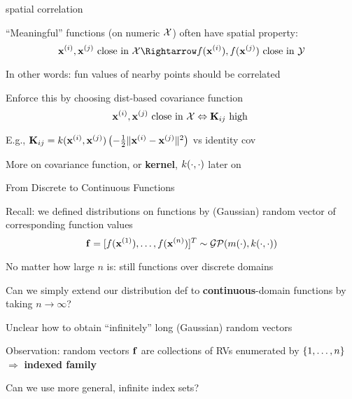 \documentclass[11pt,compress,t,notes=noshow, xcolor=table]{beamer}
\begin{document}
\begin{framei}{spatial correlation}
\item ``Meaningful'' functions (on numeric $\Xspace$) often have spatial property:
$$\xi, \xi[j] \text{ close in } \Xspace \Rightarrow f(\xi), f(\xi[j]) \text{ close in } \Yspace$$
\item In other words: fun values of nearby points should be correlated
\item Enforce this by choosing dist-based covariance function
$$ \xi[i], \xi[j] \text{ close in } \Xspace \Leftrightarrow \Kmat_{ij} \text{ high }$$
\item E.g., $\Kmat_{ij} = \kxij = \exp \left(- \tfrac{1}{2} \| \xi - \xi[j] \|^2 \right)$ vs identity cov
\vfill
{}
\item More on covariance function, or \textbf{kernel}, $\kcc$ later on
\end{framei} 

\begin{framei}[sep=L]{From Discrete to Continuous Functions}
\item Recall: we defined distributions on functions by (Gaussian) random vector of corresponding function values 
$$\fv = \fvec^T \sim \gpmk$$
\item No matter how large $n$ is: still functions over discrete domains
\item Can we simply extend our distribution def to \textbf{continuous}-domain functions by taking $n \rightarrow \infty$?
\item Unclear how to obtain ``infinitely'' long (Gaussian) random vectors
\item Observation: random vectors $\fv$ are collections of RVs enumerated by $\nset$ $\Rightarrow$ \textbf{indexed family} 
\item Can we use more general, infinite index sets?
\end{framei}
\end{document}

